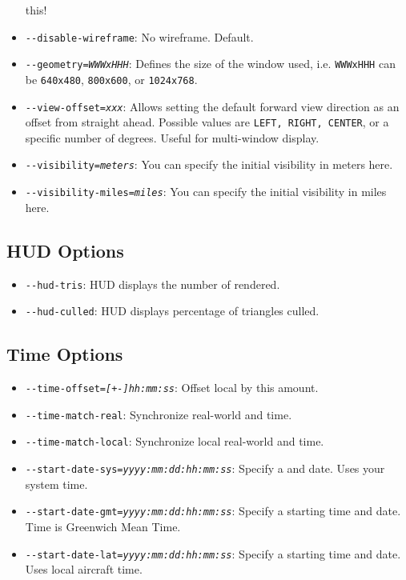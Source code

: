 \begin{itemize}
this!
\item{\texttt{-$ $-disable-wireframe}}: No wireframe. Default.
\item{\texttt{-$ $-geometry={\it WWWxHHH}}}: Defines the size of the window used, i.e.
\texttt{WWWxHHH} can be \texttt{640x480}, \texttt{800x600}, or
\texttt{1024x768}.
\item{\texttt{-$ $-view-offset={\it xxx}}}: Allows setting the default forward view direction as an offset from straight
ahead. Possible values are \texttt{LEFT, RIGHT, CENTER}, or a specific number of degrees.
Useful for multi-window display.
\item{\texttt{-$ $-visibility={\it meters}}}: You can specify the initial visibility in meters here.
\item{\texttt{-$ $-visibility-miles={\it miles}}}: You can specify the initial visibility in miles here.
\end{itemize}

\subsection{HUD Options}
\begin{itemize}
\item{\texttt{-$ $-hud-tris}}: HUD displays the number of  rendered.
\item{\texttt{-$ $-hud-culled}}: HUD displays percentage of triangles culled.
\end{itemize}
\subsection{Time Options}
\begin{itemize}
\item{\texttt{-$ $-time-offset={\it [+-]hh:mm:ss}}}: Offset local  by this amount.
\item{\texttt{-$ $-time-match-real}}: Synchronize real-world and \FlightGear{} time.
\item{\texttt{-$ $-time-match-local}}: Synchronize local real-world and \FlightGear{} time.
\item{\texttt{-$ $-start-date-sys={\it yyyy:mm:dd:hh:mm:ss}}}: Specify a  and date. Uses your system time.
\item{\texttt{-$ $-start-date-gmt={\it yyyy:mm:dd:hh:mm:ss}}}: Specify a starting time and
date. Time is Greenwich Mean Time.
\item{\texttt{-$ $-start-date-lat={\it yyyy:mm:dd:hh:mm:ss}}}: Specify a starting time and
date. Uses local aircraft time.
\end{itemize}
